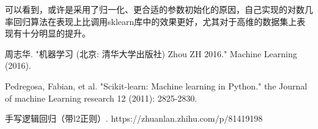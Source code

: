 \documentclass{SCIS2020cn}
\begin{document}
可以看到，或许是采用了归一化、更合适的参数初始化的原因，自己实现的对数几率回归算法在表现上比调用sklearn库中的效果更好，尤其对于高维的数据集上表现有十分明显的提升。



\begin{thebibliography}{99}

 周志华. "机器学习 (北京: 清华大学出版社) Zhou ZH 2016." Machine Learning (2016).

 Pedregosa, Fabian, et al. "Scikit-learn: Machine learning in Python." the Journal of machine Learning research 12 (2011): 2825-2830.

 手写逻辑回归（带l2正则）. https://zhuanlan.zhihu.com/p/81419198


\end{thebibliography}
\end{document}
